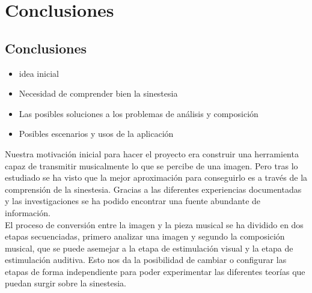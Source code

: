 \chapter{Conclusiones}





\section{Conclusiones}


\begin{itemize}
	
	\item idea inicial
	\item Necesidad de comprender bien la sinestesia
	\item Las posibles soluciones a los problemas de análisis y composición
	\item Posibles escenarios y usos de la aplicación

\end{itemize}

Nuestra motivación inicial para hacer el proyecto era construir una herramienta capaz de transmitir musicalmente lo que se percibe de una imagen. Pero tras lo estudiado se ha visto que la mejor aproximación para conseguirlo es a través de la comprensión de la sinestesia. Gracias a las diferentes experiencias documentadas y las investigaciones se ha podido encontrar una fuente abundante de información.\\

El proceso de conversión entre la imagen y la pieza musical se ha dividido en dos etapas secuenciadas, primero analizar una imagen y segundo la composición musical, que se puede asemejar a la etapa de estimulación visual y la etapa de estimulación auditiva. Esto nos da la posibilidad de cambiar o configurar las etapas de forma independiente para poder experimentar las diferentes teorías que puedan surgir sobre la sinestesia.\\

